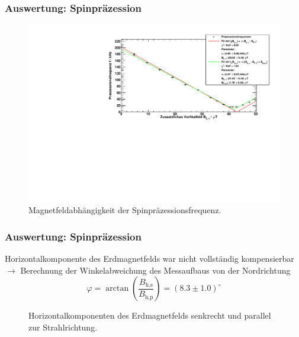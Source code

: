 \begin{frame}
\frametitle{Auswertung: Spinpräzession}

\begin{figure}
    \centering
    \includegraphics[width=\textwidth]{../img/Rb85.pdf}
    \caption{Magnetfeldabhängigkeit der Spinpräzessionsfrequenz.}  
\end{figure} 
  
\end{frame}


\begin{frame}
\frametitle{Auswertung: Spinpräzession}

Horizontalkomponente des Erdmagnetfelds war nicht vollständig kompensierbar
$\to$ Berechnung der Winkelabweichung des Messaufbaus von der Nordrichtung
\begin{equation*}
    \varphi = \arctan\left( \frac{B_\text{h,s}}{B_\text{h,p}} \right)
    = (8.3 \pm 1.0)^\circ
\end{equation*}

\begin{figure}
    \centering
    \def\svgwidth{0.5\textwidth}
    
    \caption{Horizontalkomponenten des Erdmagnetfelds senkrecht und parallel zur Strahlrichtung.}
\end{figure}
  
\end{frame}

